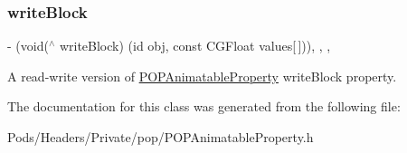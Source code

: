 \subsubsection{\texorpdfstring{write\+Block}{writeBlock}}
{\footnotesize\ttfamily -\/ (void($^\wedge$ write\+Block) (id obj, const C\+G\+Float values\mbox{[}$\,$\mbox{]}))\hspace{0.3cm}{\ttfamily [read]}, {\ttfamily [write]}, {\ttfamily [nonatomic]}, {\ttfamily [copy]}}

A read-\/write version of \mbox{\hyperlink{interface_p_o_p_animatable_property}{P\+O\+P\+Animatable\+Property}} write\+Block property. 

The documentation for this class was generated from the following file\+:\begin{DoxyCompactItemize}
\item 
Pods/\+Headers/\+Private/pop/P\+O\+P\+Animatable\+Property.\+h\end{DoxyCompactItemize}

